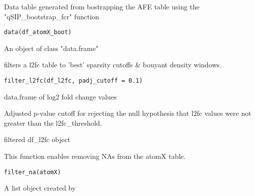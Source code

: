 \documentclass[a4paper]{book}
\begin{document}
%
\begin{Description}\relax
Data table generated from bostrapping the AFE table using the "qSIP\_bootstrap\_fcr" function
\end{Description}
%
\begin{Usage}
\begin{verbatim}
data(df_atomX_boot)
\end{verbatim}
\end{Usage}
%
\begin{Format}
An object of class "data.frame"
\end{Format}
%
\begin{Description}\relax
{} filters a l2fc table to 'best' sparsity cutoffs \&
bouyant density windows.
\end{Description}
%
\begin{Usage}
\begin{verbatim}
filter_l2fc(df_l2fc, padj_cutoff = 0.1)
\end{verbatim}
\end{Usage}
%
\begin{Arguments}
\begin{ldescription}
\item[\code{df\_l2fc}] data.frame of log2 fold change values

\item[\code{padj\_cutoff}] Adjusted p-value cutoff for rejecting the null hypothesis
that l2fc values were not greater than the l2fc\_threshold.
\end{ldescription}
\end{Arguments}
%
\begin{Value}
filtered df\_l2fc object
\end{Value}
%
\begin{Description}\relax
This function enables removing NAs from the atomX table.
\end{Description}
%
\begin{Usage}
\begin{verbatim}
filter_na(atomX)
\end{verbatim}
\end{Usage}
%
\begin{Arguments}
\begin{ldescription}
\item[\code{atomX}] A list object created by 
\end{ldescription}
\end{Arguments}
\end{document}
